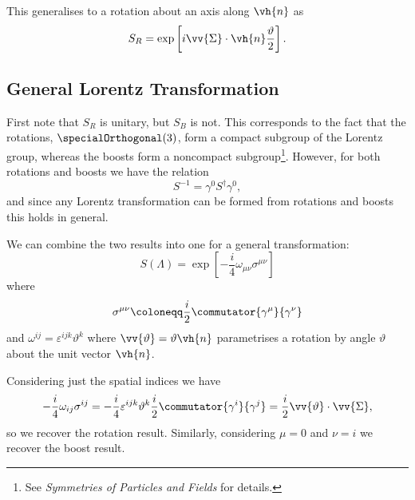 \documentclass[fleqn]{NotesClass}
\newcommand*{\course}[1]{\textit{#1}}
\newcommand{\hermit}{{\dagger}}
\begin{document}
    This generalises to a rotation about an axis along \(\vh{n}\) as
    \begin{equation}
        S_R = \exp\left[ i\vv{\Sigma} \cdot \vh{n} \frac{\vartheta}{2} \right].
    \end{equation}
    
    \subsection{General Lorentz Transformation}
    First note that \(S_R\) is unitary, but \(S_B\) is not.
    This corresponds to the fact that the rotations, \(\specialOrthogonal(3)\), form a compact subgroup of the Lorentz group, whereas the boosts form a noncompact subgroup\footnote{See \course{Symmetries of Particles and Fields} for details.}.
    However, for both rotations and boosts we have the relation
    \begin{equation}
        S^{-1} = \gamma^0 S^\hermit \gamma^0,
    \end{equation}
    and since any Lorentz transformation can be formed from rotations and boosts this holds in general.
    
    We can combine the two results into one for a general transformation:
    \begin{equation}
        S(\Lambda) = \exp\left[ -\frac{i}{4}\omega_{\mu\nu}\sigma^{\mu\nu} \right]
    \end{equation}
    where
    \begin{equation}
        \sigma^{\mu\nu} \coloneqq \frac{i}{2}\commutator{\gamma^\mu}{\gamma^\nu}
    \end{equation}
    and \(\omega^{ij} = \varepsilon^{ijk}\vartheta^k\) where \(\vv{\vartheta} = \vartheta \vh{n}\) parametrises a rotation by angle \(\vartheta\) about the unit vector \(\vh{n}\).
    
    Considering just the spatial indices we have
    \begin{equation}
        -\frac{i}{4}\omega_{ij}\sigma^{ij} = -\frac{i}{4}\varepsilon^{ijk}\vartheta^k \frac{i}{2}\commutator{\gamma^i}{\gamma^j} = \frac{i}{2} \vv{\vartheta} \cdot \vv{\Sigma},
    \end{equation}
    so we recover the rotation result.
    Similarly, considering \(\mu = 0\) and \(\nu = i\) we recover the boost result.
    
\end{document}
